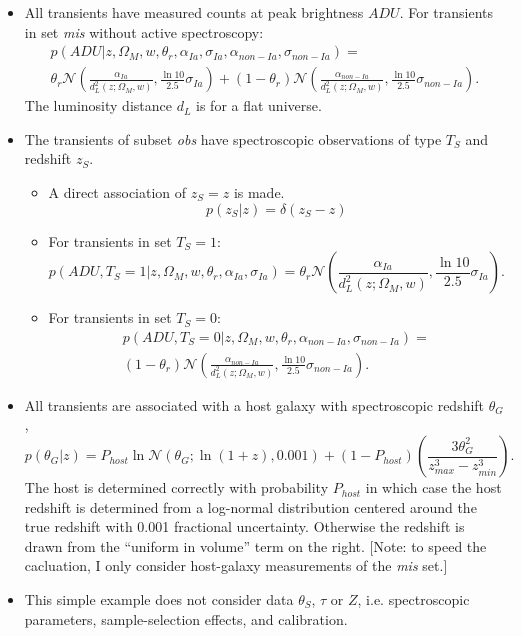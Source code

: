 \documentclass[preprint]{aastex}
\begin{document}
\begin{itemize}
\item All transients have measured counts at peak brightness $\mathit{ADU}$.
For transients in set {\it mis} without active spectroscopy:
\begin{multline}
p(\mathit{ADU}| z, \Omega_M, w, \theta_r, \alpha_{Ia},\sigma_{Ia}, \alpha_{\mathit{non-Ia}},\sigma_{\mathit{non-Ia}})=\\
\theta_r\mathcal{N}\left(\frac{\alpha_{Ia}}{d_L^2(z;\Omega_M, w)}, \frac{\ln{10}}{2.5}\sigma_{Ia}\right)+\left(1-\theta_r\right)
\mathcal{N}\left(\frac{\alpha_{\mathit{non-Ia}}}{d_L^2(z;\Omega_M, w)}, \frac{\ln{10}}{2.5}\sigma_{\mathit{non-Ia}}\right).
\end{multline}
The luminosity distance $d_L$ is for a flat universe.  
\item The transients of subset {\it obs} have spectroscopic observations of type $T_S$ and redshift
$z_S$.
\begin{itemize}
\item A direct association of $z_S=z$ is made.
\begin{equation}
p(z_S|z) = \delta(z_S-z)
\label{specz:eqn}
\end{equation}
\item For transients in set $T_S=1$:
\begin{equation}
p(\mathit{ADU}, T_S=1 | z, \Omega_M, w, \theta_r, \alpha_{Ia},\sigma_{Ia})=
\theta_r\mathcal{N}\left(\frac{\alpha_{Ia}}{d_L^2(z;\Omega_M, w)}, \frac{\ln{10}}{2.5}\sigma_{Ia}\right).
\end{equation}
\item For transients in set $T_S=0$:
\begin{multline}
p(\mathit{ADU}, T_S=0 | z, \Omega_M, w, \theta_r, \alpha_{\mathit{non-Ia}},\sigma_{\mathit{non-Ia}})= \\
\left(1-\theta_r\right)
\mathcal{N}\left(\frac{\alpha_{\mathit{non-Ia}}}{d_L^2(z;\Omega_M, w)}, \frac{\ln{10}}{2.5}\sigma_{\mathit{non-Ia}}\right).
\end{multline}
\end{itemize}
\item All transients are associated with a host galaxy with spectroscopic redshift $\theta_G$,
\begin{equation}
p(\theta_G|z) =
	P_{host} \ln{\mathcal{N}}(\theta_G;\ln(1+z),0.001) + (1-P_{host})\left(\frac{3 \theta_G^2}{z_{max}^3 - z_{min}^3}\right).
\end{equation}
The host is determined correctly with probability $P_{host}$ in which case the
host redshift is determined from a log-normal distribution centered around the true redshift
with 0.001 fractional uncertainty.   Otherwise the redshift is drawn from the ``uniform in volume'' term on the right.
[Note: to speed the cacluation, I only consider host-galaxy measurements
of the {\it mis} set.]
\item This simple example does not consider data $\theta_S$, $\tau$ or $Z$, i.e.
spectroscopic parameters, sample-selection effects, and calibration.
\end{itemize}
\end{document}
